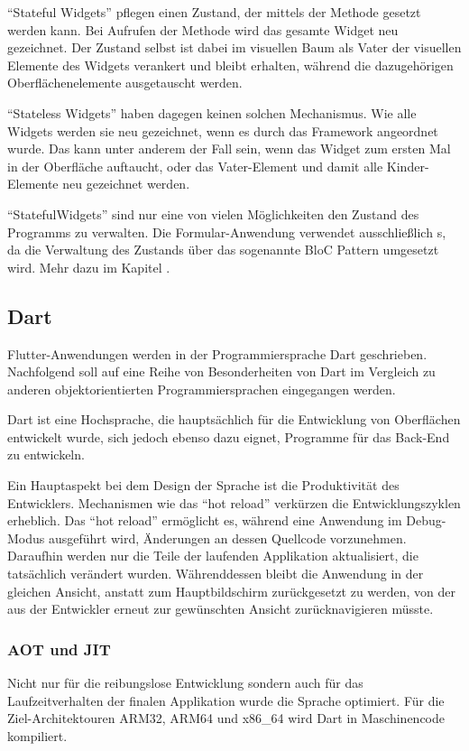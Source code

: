 \enquote{Stateful Widgets} pflegen einen Zustand, der mittels der Methode  gesetzt werden kann.
Bei Aufrufen der Methode wird das gesamte Widget neu gezeichnet.
Der Zustand selbst ist dabei im visuellen Baum als Vater der visuellen Elemente des Widgets verankert und bleibt erhalten, während die dazugehörigen Oberflächenelemente ausgetauscht werden.

\enquote{Stateless Widgets} haben dagegen keinen solchen Mechanismus.
Wie alle Widgets werden sie neu gezeichnet, wenn es durch das Framework angeordnet wurde.
Das kann unter anderem der Fall sein, wenn das Widget zum ersten Mal in der Oberfläche auftaucht, oder das Vater-Element und damit alle Kinder-Elemente neu gezeichnet werden.

\enquote{StatefulWidgets} sind nur eine von vielen Möglichkeiten den Zustand des Programms zu verwalten.
Die Formular-Anwendung verwendet ausschließlich s, da die Verwaltung des Zustands über das sogenannte BloC Pattern umgesetzt wird.
Mehr dazu im Kapitel .


\subsection{Dart}

Flutter-Anwendungen werden in der Programmiersprache Dart geschrieben.
Nachfolgend soll auf eine Reihe von Besonderheiten von Dart im Vergleich zu anderen objektorientierten Programmiersprachen eingegangen werden.

Dart ist eine Hochsprache, die hauptsächlich für die Entwicklung von Oberflächen entwickelt wurde, sich jedoch ebenso dazu eignet, Programme für das Back-End zu entwickeln.

Ein Hauptaspekt bei dem Design der Sprache ist die Produktivität des Entwicklers.
Mechanismen wie das \enquote{hot reload} verkürzen die Entwicklungszyklen erheblich.
Das \enquote{hot reload} ermöglicht es, während eine Anwendung im Debug-Modus ausgeführt wird, Änderungen an dessen Quellcode vorzunehmen.
Daraufhin werden nur die Teile der laufenden Applikation aktualisiert, die tatsächlich verändert wurden.
 Währenddessen bleibt die Anwendung in der gleichen Ansicht, anstatt zum Hauptbildschirm zurückgesetzt zu werden, von der aus der Entwickler erneut zur gewünschten Ansicht zurücknavigieren müsste.

\subsubsection{AOT und JIT}
Nicht nur für die reibungslose Entwicklung sondern auch für das Laufzeitverhalten der finalen Applikation wurde die Sprache optimiert.
Für die Ziel-Architektouren ARM32, ARM64 und x86_64 wird Dart in Maschinencode kompiliert.

